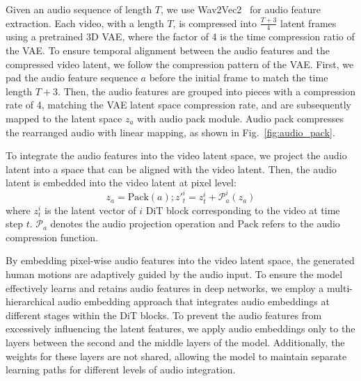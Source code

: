 Given an audio sequence of length $T$, we use Wav2Vec2~\cite{baevski2020wav2vec} for audio feature extraction. Each video, with a length $T$, is compressed into $\frac{T+3}{4}$ latent frames using a pretrained 3D VAE, where the factor of 4 is the time compression ratio of the VAE. To ensure temporal alignment between the audio features and the compressed video latent, we follow the compression pattern of the VAE. First, we pad the audio feature sequence $a$ before the initial frame to match the time length $T+3$. Then, the audio features are grouped into pieces with a compression rate of 4, matching the VAE latent space compression rate, and are subsequently mapped to the latent space $z_a$ with audio pack module. Audio pack compresses the rearranged audio with linear mapping, as shown in Fig.~\ref{fig:audio_pack}. 

To integrate the audio features into the video latent space, we project the audio latent into a space that can be aligned with the video latent. Then, the audio latent is embedded into the video latent at pixel level:
$$
z_a = \text{Pack}(a); z'^i_t = z^i_t +\mathcal{P}^i_a(z_a)
$$ 
where $z^i_t$ is the latent vector of $i$ DiT block corresponding to the video at time step $t$. $\mathcal{P}_a$ denotes the audio projection operation and $\text{Pack}$ refers to the audio compression function. 

By embedding pixel-wise audio features into the video latent space, the generated human motions are adaptively guided by the audio input. To ensure the model effectively learns and retains audio features in deep networks, we employ a multi-hierarchical audio embedding approach that integrates audio embeddings at different stages within the DiT blocks. To prevent the audio features from excessively influencing the latent features, we apply audio embeddings only to the layers between the second and the middle layers of the model. Additionally, the weights for these layers are not shared, allowing the model to maintain separate learning paths for different levels of audio integration.







